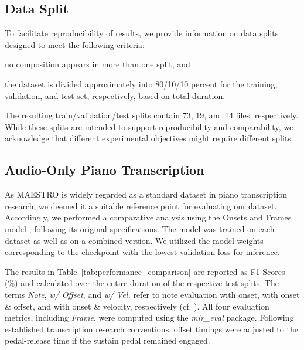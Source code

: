 \documentclass{article}
\begin{document}
\subsection{Data Split}
To facilitate reproducibility of results, we provide information on data splits designed to meet the following criteria: 
\begin{inparaenum}[(i)]
    \item no composition appears in more than one split, and 
    \item the dataset is divided approximately into 80/10/10 percent for the training, validation, and test set, respectively, based on total duration. 
\end{inparaenum}
The resulting train/validation/test splits contain 73, 19, and 14 files, respectively. While these splits are intended to support reproducibility and comparability, we acknowledge that different experimental objectives might require different splits.

\subsection{Audio-Only Piano Transcription}
As MAESTRO is widely regarded as a standard dataset in piano transcription research, we deemed it a suitable reference point for evaluating our dataset. Accordingly, we performed a comparative analysis using the Onsets and Frames model \cite{ISMIR18Hawthorne}, following its original specifications. The model was trained on each dataset as well as on a combined version. We utilized the model weights corresponding to the checkpoint with the lowest validation loss for inference. 

The results in Table~\ref{tab:performance_comparison} are reported as F1 Scores (\%) and calculated over the entire duration of the respective test splits. The terms \textit{Note}, \textit{w/ Offset}, and \textit{w/ Vel.} refer to note evaluation with onset, with onset \& offset, and with onset \& velocity, respectively (cf. \cite{TASLP21Kong}). All four evaluation metrics, including \textit{Frame}, were computed using the \textit{mir\_eval} package. Following established transcription research conventions, offset timings were adjusted to the pedal-release time if the sustain pedal remained engaged.
\end{document}
